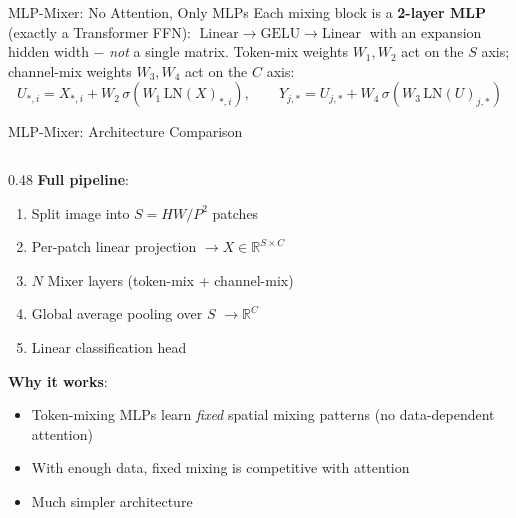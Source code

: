 \begin{frame}[fragile]{MLP-Mixer: No Attention, Only MLPs}
  \vspace{0.1em}
  {\small
  Each mixing block is a \textbf{2-layer MLP} (exactly a Transformer FFN): $\;\text{Linear} \to \text{GELU} \to \text{Linear}\;$ with an expansion hidden width $-$ \emph{not} a single matrix. Token-mix weights $W_1,W_2$ act on the $S$ axis; channel-mix weights $W_3,W_4$ act on the $C$ axis:}
  \[
    U_{*,i} = X_{*,i} + W_2\, \sigma(W_1\, \text{LN}(X)_{*,i}), \qquad
    Y_{j,*} = U_{j,*} + W_4\, \sigma(W_3\, \text{LN}(U)_{j,*})
  \]
\end{frame}

\begin{frame}{MLP-Mixer: Architecture Comparison}

  \begin{columns}
    \begin{column}{0.48\textwidth}
      \textbf{Full pipeline}:
      \begin{enumerate}
        \item Split image into $S = HW/P^2$ patches
        \item Per-patch linear projection $\to X \in \mathbb{R}^{S \times C}$
        \item $N$ Mixer layers (token-mix + channel-mix)
        \item Global average pooling over $S$ $\to \mathbb{R}^C$
        \item Linear classification head
      \end{enumerate}

      \vspace{0.3em}
      \textbf{Why it works}:
      \begin{itemize}
        \item Token-mixing MLPs learn \emph{fixed} spatial mixing patterns (no data-dependent attention)
        \item With enough data, fixed mixing is competitive with attention
        \item Much simpler architecture
      \end{itemize}


\end{column}
\end{columns}
\end{frame}
